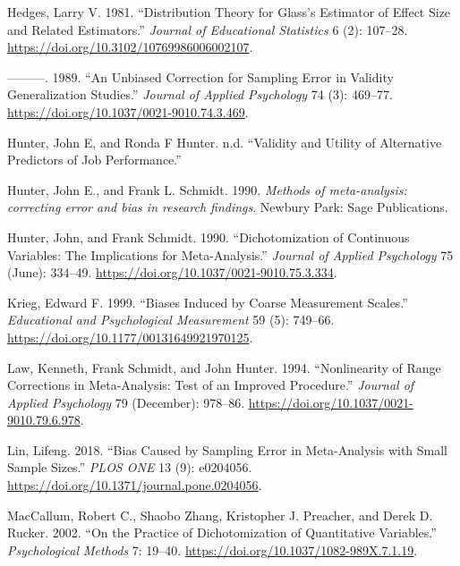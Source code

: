 \documentclass[
  letterpaper,
  DIV=11,
  numbers=noendperiod]{scrreprt}
\newlength{\cslhangindent}
\newlength{\cslentryspacingunit} %
\newenvironment{CSLReferences}[2] %
 {%
  \setlength{\parindent}{0pt}
  \ifodd #1
  \let\oldpar\par
  \def\par{\hangindent=\cslhangindent\oldpar}
  \fi
  \setlength{\parskip}{#2\cslentryspacingunit}
 }%
 {}
\begin{document}
\begin{CSLReferences}{1}{0}
\leavevmode{}%
Hedges, Larry V. 1981. {``Distribution Theory for Glass's Estimator of
Effect Size and Related Estimators.''} \emph{Journal of Educational
Statistics} 6 (2): 107--28.
\url{https://doi.org/10.3102/10769986006002107}.

\leavevmode{}%
---------. 1989. {``An Unbiased Correction for Sampling Error in
Validity Generalization Studies.''} \emph{Journal of Applied Psychology}
74 (3): 469--77. \url{https://doi.org/10.1037/0021-9010.74.3.469}.

\leavevmode{}%
Hunter, John E, and Ronda F Hunter. n.d. {``Validity and Utility of
Alternative Predictors of Job Performance.''}

\leavevmode{}%
Hunter, John E., and Frank L. Schmidt. 1990. \emph{Methods of
meta-analysis: correcting error and bias in research findings}. Newbury
Park: Sage Publications.

\leavevmode{}%
Hunter, John, and Frank Schmidt. 1990. {``Dichotomization of Continuous
Variables: The Implications for Meta-Analysis.''} \emph{Journal of
Applied Psychology} 75 (June): 334--49.
\url{https://doi.org/10.1037/0021-9010.75.3.334}.

\leavevmode{}%
Krieg, Edward F. 1999. {``Biases Induced by Coarse Measurement
Scales.''} \emph{Educational and Psychological Measurement} 59 (5):
749--66. \url{https://doi.org/10.1177/00131649921970125}.

\leavevmode{}%
Law, Kenneth, Frank Schmidt, and John Hunter. 1994. {``Nonlinearity of
Range Corrections in Meta-Analysis: Test of an Improved Procedure.''}
\emph{Journal of Applied Psychology} 79 (December): 978--86.
\url{https://doi.org/10.1037/0021-9010.79.6.978}.

\leavevmode{}%
Lin, Lifeng. 2018. {``Bias Caused by Sampling Error in Meta-Analysis
with Small Sample Sizes.''} \emph{PLOS ONE} 13 (9): e0204056.
\url{https://doi.org/10.1371/journal.pone.0204056}.

\leavevmode{}%
MacCallum, Robert C., Shaobo Zhang, Kristopher J. Preacher, and Derek D.
Rucker. 2002. {``On the Practice of Dichotomization of Quantitative
Variables.''} \emph{Psychological Methods} 7: 19--40.
\url{https://doi.org/10.1037/1082-989X.7.1.19}.


\end{CSLReferences}
\end{document}
